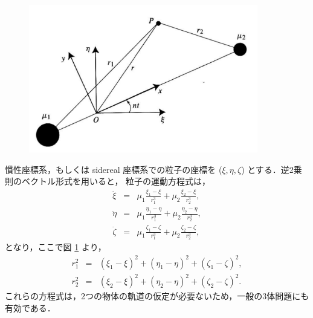\documentclass[11pt,a4paper,oneside,onecolumn]{jarticle}
\begin{document}
\begin{figure}[H]
\centering
\includegraphics[width=10cm]{./image/sec3_1.pdf}
\caption{\label{fig:xi_eta_zeta}}
\end{figure}

慣性座標系，もしくは sidereal 座標系での粒子の座標を ($\xi, \eta, \zeta$) とする．逆2乗則のベクトル形式を用いると，
粒子の運動方程式は，
\begin{eqnarray}
\ddot{\xi} & = & \mu_1 \frac{\xi_1 - \xi}{r_1^3} + \mu_2 \frac{\xi_2 - \xi}{r_2^3}, \label{eq:xiddot}\\
\ddot{\eta} & = & \mu_1 \frac{\eta_1 - \eta}{r_1^3} + \mu_2 \frac{\eta_2 - \eta}{r_2^3}, \label{eq:etaddot}\\
\ddot{\zeta} & = & \mu_1 \frac{\zeta_1 - \zeta}{r_1^3} + \mu_2 \frac{\zeta_2 - \zeta}{r_2^3}, \label{eq:zetaddot}
\end{eqnarray}
となり，ここで図 \ref{fig:xi_eta_zeta} より，
\begin{eqnarray}
r_1^2 & = & (\xi_1 - \xi)^2 + (\eta_1 - \eta)^2 + (\zeta_1 - \zeta)^2,\\
r_2^2 & = & (\xi_2 - \xi)^2 + (\eta_2 - \eta)^2 + (\zeta_2 - \zeta)^2.
\end{eqnarray}
これらの方程式は，2つの物体の軌道の仮定が必要ないため，一般の3体問題にも有効である．
\end{document}
